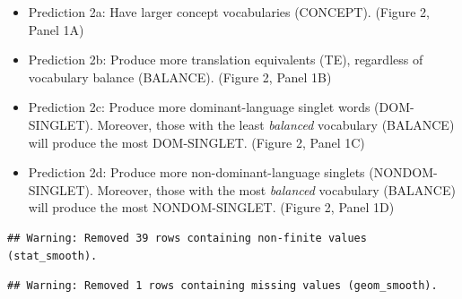 \documentclass[
  english,
  ,man,floatsintext]{apa6}
\providecommand{\tightlist}{%
  \setlength{\itemsep}{0pt}\setlength{\parskip}{0pt}}
\begin{document}
\begin{itemize}
\tightlist
\item
  Prediction 2a: Have larger concept vocabularies (CONCEPT). (Figure 2, Panel 1A)
\item
  Prediction 2b: Produce more translation equivalents (TE), regardless of vocabulary balance (BALANCE). (Figure 2, Panel 1B)
\item
  Prediction 2c: Produce more dominant-language singlet words (DOM-SINGLET). Moreover, those with the least \emph{balanced} vocabulary (BALANCE) will produce the most DOM-SINGLET. (Figure 2, Panel 1C)
\item
  Prediction 2d: Produce more non-dominant-language singlets (NONDOM-SINGLET). Moreover, those with the most \emph{balanced} vocabulary (BALANCE) will produce the most NONDOM-SINGLET. (Figure 2, Panel 1D)
\end{itemize}

\begin{verbatim}
## Warning: Removed 39 rows containing non-finite values (stat_smooth).
\end{verbatim}

\begin{verbatim}
## Warning: Removed 1 rows containing missing values (geom_smooth).
\end{verbatim}
\end{document}
